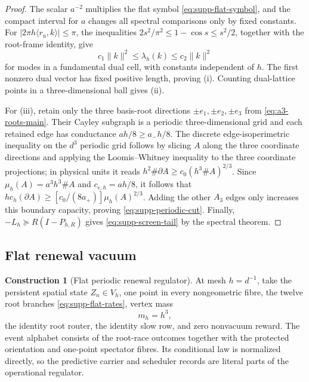\documentclass[11pt]{article}
\theoremstyle{definition}
\newtheorem{construction}[construction]{Construction}
\theoremstyle{remark}
\newcommand{\norm}[1]{\lVert#1\rVert}
\newcommand{\abs}[1]{\lvert#1\rvert}
\begin{document}
\begin{proof}
The scalar $a^{-2}$ multiplies the flat symbol
\eqref{eq:supp-flat-symbol}, and the compact interval for $a$ changes all
spectral comparisons only by fixed constants.  For $\abs{2\pi h\langle
r_a,k\rangle}\le\pi$, the inequalities
$2s^2/\pi^2\le1-\cos s\le s^2/2$, together with the root-frame identity, give
\begin{equation}
 c_1\norm{k}^2\le\lambda_h(k)\le c_2\norm{k}^2
 \label{eq:supp-symbol-comparison}
\end{equation}
for modes in a fundamental dual cell, with constants independent of $h$.
The first nonzero dual vector has fixed positive length, proving (i).
Counting dual-lattice points in a three-dimensional ball gives (ii).

For (iii), retain only the three basis-root directions
$\pm e_1,\pm e_2,\pm e_3$ from \eqref{eq:a3-roots-main}.  Their Cayley
subgraph is a periodic three-dimensional grid and each retained edge has
conductance $ah/8\ge a_-h/8$.  The discrete edge-isoperimetric inequality on
the $d^3$ periodic grid follows by slicing $A$ along the three coordinate
directions and applying the Loomis--Whitney inequality to the three coordinate
projections; in physical units it reads
$h^2\#\partial A\ge c_0(h^3\#A)^{2/3}$.  Since
$\mu_h(A)=a^3h^3\#A$ and $c_{e,h}=ah/8$, it follows that
$h c_h(\partial A)\ge[c_0/(8a_+)]\mu_h(A)^{2/3}$.
Adding the other $A_3$ edges only increases this boundary capacity, proving
\eqref{eq:supp-periodic-cut}.  Finally,
$-L_h\succeq R(I-P_{h,R})$ gives
\eqref{eq:supp-screen-tail} by the spectral theorem.
\end{proof}

\subsection{Flat renewal vacuum}

\begin{construction}[Flat periodic renewal regulator]
\label{con:supp-flat-regulator}
At mesh $h=d^{-1}$, take the persistent spatial state $Z_n\in V_h$, one point
in every nongeometric fibre, the twelve root branches
\eqref{eq:supp-flat-rates}, vertex mass
\begin{equation}
 m_h=h^3,
 \label{eq:supp-flat-mass}
\end{equation}
the identity root router, the identity slow row, and zero nonvacuum reward.
The event alphabet consists of the root-race outcomes together with the
protected orientation and one-point spectator fibres.  Its conditional law is
normalized directly, so the predictive carrier and scheduler records are
literal parts of the operational regulator.
\end{construction}
\end{document}
